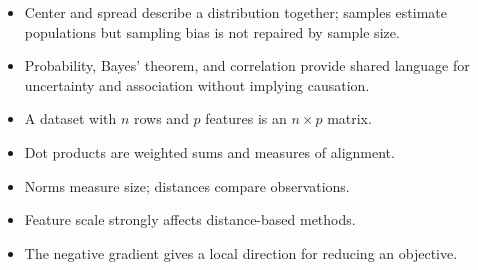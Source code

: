 \begin{chapterrecap}
\begin{itemize}
  \item Center and spread describe a distribution together; samples estimate populations but sampling bias is not repaired by sample size.
  \item Probability, Bayes' theorem, and correlation provide shared language for uncertainty and association without implying causation.
  \item A dataset with $n$ rows and $p$ features is an $n\times p$ matrix.
  \item Dot products are weighted sums and measures of alignment.
  \item Norms measure size; distances compare observations.
  \item Feature scale strongly affects distance-based methods.
  \item The negative gradient gives a local direction for reducing an objective.
\end{itemize}
\end{chapterrecap}
